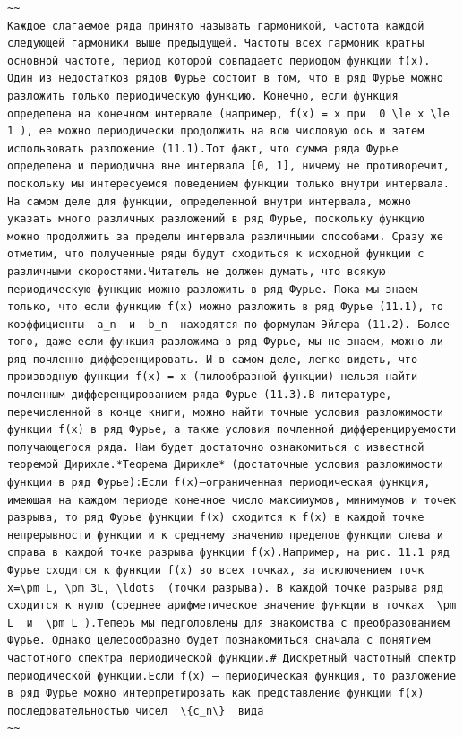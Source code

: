 \documentclass[
  ukrainian,
]{article}
\begin{document}
\begin{verbatim}
~~
Каждое слагаемое ряда принято называть гармоникой, частота каждой следующей гармоники выше предыдущей. Частоты всех гармоник кратны основной частоте, период которой совпадаетс периодом функции f(x). Один из недостатков рядов Фурье состоит в том, что в ряд Фурье можно разложить только периодическую функцию. Конечно, если функция определена на конечном интервале (например, f(x) = x при  0 \le x \le 1 ), ее можно периодически продолжить на всю числовую ось и затем использовать разложение (11.1).Тот факт, что сумма ряда Фурье определена и периодична вне интервала [0, 1], ничему не противоречит, поскольку мы интересуемся поведением функции только внутри интервала. На самом деле для функции, определенной внутри интервала, можно указать много различных разложений в ряд Фурье, поскольку функцию можно продолжить за пределы интервала различными способами. Сразу же отметим, что полученные ряды будут сходиться к исходной функции с различными скоростями.Читатель не должен думать, что всякую периодическую функцию можно разложить в ряд Фурье. Пока мы знаем только, что если функцию f(x) можно разложить в ряд Фурье (11.1), то коэффициенты  a_n  и  b_n  находятся по формулам Эйлера (11.2). Более того, даже если функция разложима в ряд Фурье, мы не знаем, можно ли ряд почленно дифференцировать. И в самом деле, легко видеть, что производную функции f(x) = x (пилообразной функции) нельзя найти почленным дифференцированием ряда Фурье (11.3).В литературе, перечисленной в конце книги, можно найти точные условия разложимости функции f(x) в ряд Фурье, а также условия почленной дифференцируемости получающегося ряда. Нам будет достаточно ознакомиться с известной теоремой Дирихле.*Теорема Дирихле* (достаточные условия разложимости функции в ряд Фурье):Если f(x)—ограниченная периодическая функция, имеющая на каждом периоде конечное число максимумов, минимумов и точек разрыва, то ряд Фурье функции f(x) сходится к f(x) в каждой точке непрерывности функции и к среднему значению пределов функции слева и справа в каждой точке разрыва функции f(x).Например, на рис. 11.1 ряд Фурье сходится к функции f(x) во всех точках, за исключением точк  x=\pm L, \pm 3L, \ldots  (точки разрыва). В каждой точке разрыва ряд сходится к нулю (среднее арифметическое значение функции в точках  \pm L  и  \pm L ).Теперь мы педголовлены для знакомства с преобразованием Фурье. Однако целесообразно будет познакомиться сначала с понятием частотного спектра периодической функции.# Дискретный частотный спектр периодической функции.Если f(x) — периодическая функция, то разложение в ряд Фурье можно интерпретировать как представление функции f(x) последовательностью чисел  \{c_n\}  вида
~~
\end{verbatim}
\end{document}
